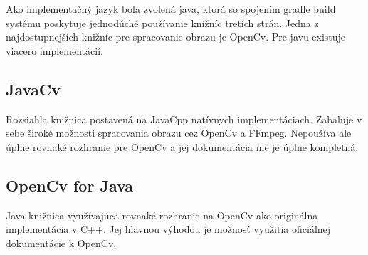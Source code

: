 Ako implementačný jazyk bola zvolená java, ktorá so spojením gradle build systému poskytuje jednodúché používanie knižníc tretích strán. Jedna z najdostupnejších knižníc pre spracovanie obrazu je OpenCv. Pre javu existuje viacero implementácií.

\subsection{JavaCv}

Rozsiahla knižnica postavená na JavaCpp natívnych implementáciach.  Zabaľuje v sebe široké možnosti spracovania obrazu cez OpenCv a FFmpeg. Nepoužíva ale úplne rovnaké rozhranie pre OpenCv a jej dokumentácia nie je úplne kompletná.

\subsection{OpenCv for Java}

Java knižnica využívajúca rovnaké rozhranie na OpenCv ako originálna implementácia v C++.  Jej hlavnou výhodou je  možnosť využitia oficiálnej dokumentácie k OpenCv.